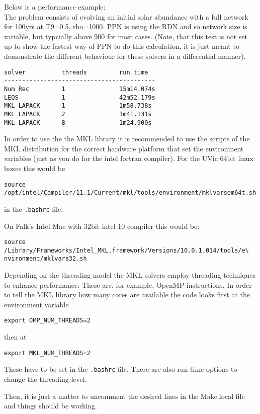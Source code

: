 Below is a performance example:\\
The problem consists of evolving an initial solar abundance with a
full network for 100yrs at T9=0.5, rho=1000. PPN is using the RDN and
so network size is variable, but typcially above 900 for most cases.
(Note, that this test is not set up to show the fastest way of PPN to
do this calculation, it is just meant to demonstrate the different
behaviour for these solvers in a differential manner).
\begin{verbatim}
solver          threads         run time
------------------------------------------
Num Rec         1               15m14.074s
LEQS            1               42m52.179s
MKL LAPACK      1               1m58.738s
MKL LAPACK      2               1m41.131s
MKL LAPACK      8               1m24.900s
\end{verbatim}



In order to use the the MKL library it is recommended to use the
scripts of the MKL distribution for the correct hardware platform that
set the environment variables (just as you do for the intel fortran
compiler). For the UVic 64bit linux boxes this would be
\begin{verbatim}
source  /opt/intel/Compiler/11.1/Current/mkl/tools/environment/mklvarsem64t.sh
\end{verbatim}
in the \texttt{.bashrc} file.

On Falk's Intel Mac with 32bit intel 10 compiler this would be:
\begin{verbatim}
source /Library/Frameworks/Intel_MKL.framework/Versions/10.0.1.014/tools/e\
nvironment/mklvars32.sh
\end{verbatim}

Depending on the threading model the MKL solvers employ threading
techniques to enhance performance. These are, for example, OpenMP
instructions. In order to tell the MKL library how many cores are
available the code looks first at the environment variable

\begin{verbatim}
export OMP_NUM_THREADS=2
\end{verbatim}
then at 
\begin{verbatim}
export MKL_NUM_THREADS=2
\end{verbatim}
These have to be set in the \texttt{.bashrc} file.
There are also run time options to change the threading level.

Then, it is just a matter to uncomment the desired lines in the Make.local file and things should be working.

